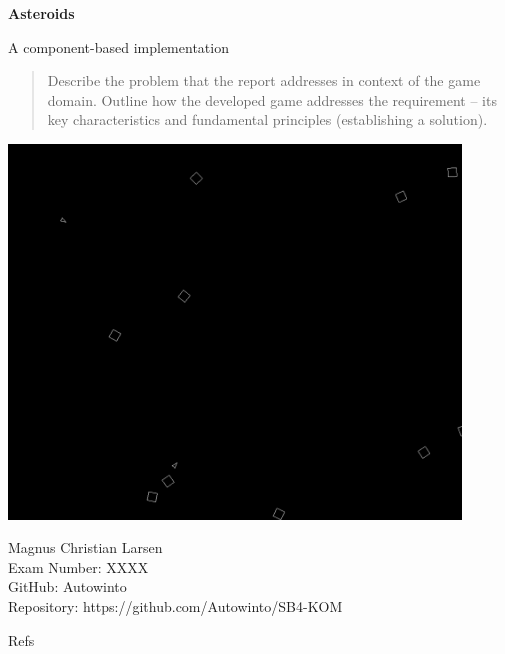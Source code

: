 \documentclass{article}
\begin{document}
\begin{titlepage}
    \begin{center}
        \vspace*{1cm}
        \Huge
        \textbf{Asteroids}

        \vspace{0.5cm}
        \LARGE
        A component-based implementation
        \begin{abstract}
            Describe the problem that the report addresses in context of the game domain.
            Outline how the developed game addresses the requirement – its key characteristics and fundamental principles (establishing a solution).

        \end{abstract}
        \includegraphics[width=12cm]{images/Asteroids}
    \end{center}


    \begin{center}
        Magnus Christian Larsen \\
        Exam Number: XXXX \\
        GitHub: Autowinto\\
        Repository: https://github.com/Autowinto/SB4-KOM\\
    \end{center}
\end{titlepage}

\tableofcontents












Refs
\end{document}
